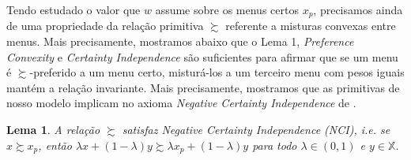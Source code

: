 \documentclass[12pt, a4paper]{article}
\theoremstyle{nonumberplain}
\theoremstyle{plain}
\theoremstyle{plain}
\theoremstyle{plain}
\newtheorem{lemma}{Lema}
\theoremstyle{nonumberplain}
\begin{document}
Tendo estudado o valor que $w$ assume sobre os menus certos $x_p$, precisamos ainda de uma propriedade da relação primitiva $\succsim$ referente a misturas convexas entre menus. Mais precisamente, mostramos abaixo que o Lema 1, \emph{Preference Convexity} e \emph{Certainty Independence} são suficientes para afirmar que se um menu é $\succsim$-preferido a um menu certo, misturá-los a um terceiro menu com pesos iguais mantém a relação invariante. Mais precisamente, mostramos que as primitivas de nosso modelo implicam no axioma \emph{Negative Certainty Independence} de \cite{Dil2010}.\\

\begin{lemma}\label{NCI}A relação $\succsim$ satisfaz \emph{Negative Certainty Independence (NCI)}, i.e. se $x\succsim x_p$, então $\lambda x +(1-\lambda)y\succsim \lambda x_p +(1-\lambda)y$ para todo $\lambda\in(0,1)$ e $y\in \mathbb{X}$.\end{lemma}
\end{document}
